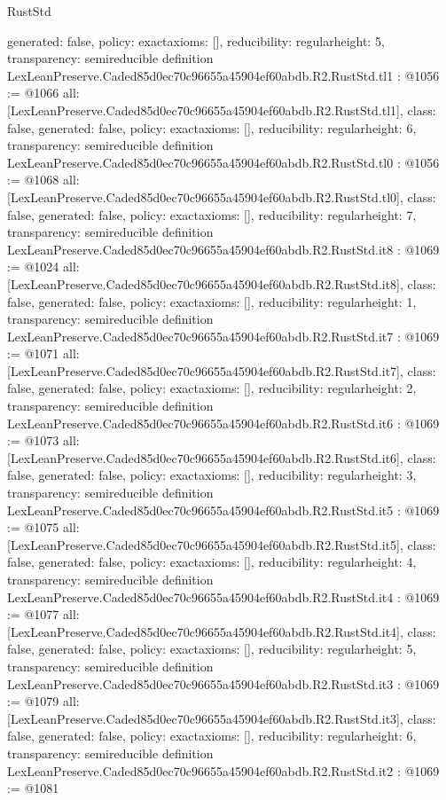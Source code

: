\begin{lexlean}{RustStd}
\begin{coremodule}
{  generated: false,
  policy: exact{axioms: []},
  reducibility: regular{height: 5},
  transparency: semireducible
}
definition LexLeanPreserve.Caded85d0ec70c96655a45904ef60abdb.R2.RustStd.tl1 : @1056 := @1066 {
  all: [LexLeanPreserve.Caded85d0ec70c96655a45904ef60abdb.R2.RustStd.tl1],
  class: false,
  generated: false,
  policy: exact{axioms: []},
  reducibility: regular{height: 6},
  transparency: semireducible
}
definition LexLeanPreserve.Caded85d0ec70c96655a45904ef60abdb.R2.RustStd.tl0 : @1056 := @1068 {
  all: [LexLeanPreserve.Caded85d0ec70c96655a45904ef60abdb.R2.RustStd.tl0],
  class: false,
  generated: false,
  policy: exact{axioms: []},
  reducibility: regular{height: 7},
  transparency: semireducible
}
definition LexLeanPreserve.Caded85d0ec70c96655a45904ef60abdb.R2.RustStd.it8 : @1069 := @1024 {
  all: [LexLeanPreserve.Caded85d0ec70c96655a45904ef60abdb.R2.RustStd.it8],
  class: false,
  generated: false,
  policy: exact{axioms: []},
  reducibility: regular{height: 1},
  transparency: semireducible
}
definition LexLeanPreserve.Caded85d0ec70c96655a45904ef60abdb.R2.RustStd.it7 : @1069 := @1071 {
  all: [LexLeanPreserve.Caded85d0ec70c96655a45904ef60abdb.R2.RustStd.it7],
  class: false,
  generated: false,
  policy: exact{axioms: []},
  reducibility: regular{height: 2},
  transparency: semireducible
}
definition LexLeanPreserve.Caded85d0ec70c96655a45904ef60abdb.R2.RustStd.it6 : @1069 := @1073 {
  all: [LexLeanPreserve.Caded85d0ec70c96655a45904ef60abdb.R2.RustStd.it6],
  class: false,
  generated: false,
  policy: exact{axioms: []},
  reducibility: regular{height: 3},
  transparency: semireducible
}
definition LexLeanPreserve.Caded85d0ec70c96655a45904ef60abdb.R2.RustStd.it5 : @1069 := @1075 {
  all: [LexLeanPreserve.Caded85d0ec70c96655a45904ef60abdb.R2.RustStd.it5],
  class: false,
  generated: false,
  policy: exact{axioms: []},
  reducibility: regular{height: 4},
  transparency: semireducible
}
definition LexLeanPreserve.Caded85d0ec70c96655a45904ef60abdb.R2.RustStd.it4 : @1069 := @1077 {
  all: [LexLeanPreserve.Caded85d0ec70c96655a45904ef60abdb.R2.RustStd.it4],
  class: false,
  generated: false,
  policy: exact{axioms: []},
  reducibility: regular{height: 5},
  transparency: semireducible
}
definition LexLeanPreserve.Caded85d0ec70c96655a45904ef60abdb.R2.RustStd.it3 : @1069 := @1079 {
  all: [LexLeanPreserve.Caded85d0ec70c96655a45904ef60abdb.R2.RustStd.it3],
  class: false,
  generated: false,
  policy: exact{axioms: []},
  reducibility: regular{height: 6},
  transparency: semireducible
}
definition LexLeanPreserve.Caded85d0ec70c96655a45904ef60abdb.R2.RustStd.it2 : @1069 := @1081 {
}
\end{coremodule}
\end{lexlean}

